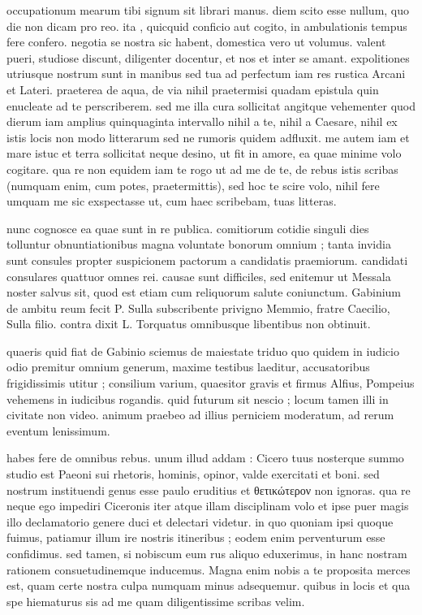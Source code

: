 


 occupationum mearum tibi signum sit librari manus. diem scito esse nullum, quo die non dicam pro reo. ita , quicquid conficio aut cogito, in ambulationis tempus fere confero. negotia se nostra sic habent, domestica vero ut volumus. valent pueri, studiose discunt, diligenter docentur, et nos et inter se amant. expolitiones utriusque nostrum sunt in manibus sed tua ad perfectum iam res rustica Arcani et Lateri. praeterea de aqua, de via nihil praetermisi quadam epistula quin enucleate ad te perscriberem. sed me illa cura sollicitat angitque vehementer quod dierum iam amplius quinquaginta intervallo nihil a te, nihil a Caesare, nihil ex istis locis non modo litterarum sed ne rumoris quidem adfluxit. me autem iam et mare istuc et terra sollicitat neque desino, ut fit in amore, ea quae minime volo cogitare. qua re non equidem iam te rogo ut ad me de te, de rebus istis scribas (numquam enim, cum potes, praetermittis), sed hoc te scire volo, nihil fere umquam me sic exspectasse ut, cum haec scribebam, tuas litteras.

 nunc cognosce ea quae sunt in re publica. comitiorum cotidie singuli dies tolluntur obnuntiationibus magna voluntate bonorum omnium ; tanta invidia sunt consules propter suspicionem pactorum a candidatis praemiorum. candidati consulares quattuor omnes rei. causae sunt difficiles, sed enitemur ut Messala noster salvus sit, quod est etiam cum reliquorum salute coniunctum. Gabinium de ambitu reum fecit P. Sulla subscribente privigno Memmio, fratre Caecilio, Sulla filio. contra dixit L. Torquatus omnibusque libentibus non obtinuit.

 quaeris quid fiat de Gabinio sciemus de maiestate triduo quo quidem in iudicio odio premitur omnium generum, maxime testibus laeditur, accusatoribus frigidissimis utitur ; consilium varium, quaesitor gravis et firmus Alfius, Pompeius vehemens in iudicibus rogandis. quid futurum sit nescio ; locum tamen illi in civitate non video. animum praebeo ad illius perniciem moderatum, ad rerum eventum lenissimum.

 habes fere de omnibus rebus. unum illud addam : Cicero tuus nosterque summo studio est Paeoni sui rhetoris, hominis, opinor, valde exercitati et boni. sed nostrum instituendi genus esse paulo eruditius et θετικώτερον non ignoras. qua re neque ego impediri Ciceronis iter atque illam disciplinam volo et ipse puer magis illo declamatorio genere duci et delectari videtur. in quo quoniam ipsi quoque fuimus, patiamur illum ire nostris itineribus ; eodem enim perventurum esse confidimus. sed tamen, si nobiscum eum rus aliquo eduxerimus, in hanc nostram rationem consuetudinemque inducemus. Magna enim nobis a te proposita merces est, quam certe nostra culpa numquam minus adsequemur. quibus in locis et qua spe hiematurus sis ad me quam diligentissime scribas velim.

